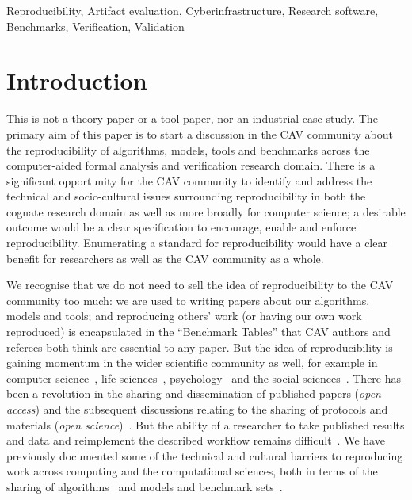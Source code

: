 \documentclass[conference]{IEEEtran}
\begin{document}
%

\begin{IEEEkeywords}
Reproducibility, Artifact evaluation, Cyberinfrastructure, Research
software, Benchmarks, Verification, Validation
\end{IEEEkeywords}


\section{Introduction}

This is not a theory paper or a tool paper, nor an industrial case
study. The primary aim of this paper is to start a discussion in the
CAV community about the reproducibility of algorithms, models, tools
and benchmarks across the computer-aided formal analysis and
verification research domain. There is a significant opportunity for
the CAV community to identify and address the technical and
socio-cultural issues surrounding reproducibility in both the cognate
research domain as well as more broadly for computer science; a
desirable outcome would be a clear specification to encourage, enable
and enforce reproducibility. Enumerating a standard for
reproducibility would have a clear benefit for researchers as well as
the CAV community as a whole.

We recognise that we do not need to sell the idea of reproducibility
to the CAV community too much: we are used to writing papers about our
algorithms, models and tools; and reproducing others' work (or having
our own work reproduced) is encapsulated in the ``Benchmark Tables''
that CAV authors and referees both think are essential to any
paper. But the idea of reproducibility is gaining momentum in the
wider scientific community as well, for example in computer
science~\cite{collberg-et-al:2014}, life
sciences~\cite{rollins-et-al:2014},
psychology~\cite{chambers-et-al:2014} and the social
sciences~\cite{conte-et-al:2012}.  There has been a revolution in the
sharing and dissemination of published papers (\emph{open access}) and
the subsequent discussions relating to the sharing of protocols and
materials (\emph{open science})~\cite{rssaaoe:2012}. But the ability
of a researcher to take published results and data and reimplement the
described workflow remains
difficult~\cite{peng:2011,sandve-et-al:2013,wilson-et-al:2014}.  We
have previously documented some of the technical and cultural barriers
to reproducing work across computing and the computational sciences,
both in terms of the sharing of algorithms~\cite{crick-et-al_wssspe2}
and models and benchmark
sets~\cite{crick-et-al_recomp2014,crick+chuehong:2014}.
\end{document}
